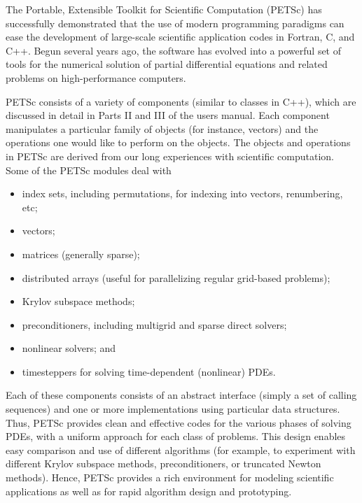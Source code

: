 
%
%
%

\label{sec_gettingstarted}

The Portable, Extensible Toolkit for Scientific Computation (PETSc)
has successfully demonstrated that the use of modern programming
paradigms can ease the development of large-scale scientific
application codes in Fortran, C, and C++.  Begun several years ago,
the software has evolved into a powerful set of tools for the
numerical solution of partial differential equations and related problems 
on high-performance computers.

PETSc consists of a variety of components (similar to classes in C++),
which are discussed in detail in Parts II and III of the users manual.
Each component manipulates a particular family of objects (for instance,
vectors) and the operations one would like to perform on the objects.
The objects and operations in PETSc are derived from our long 
experiences with scientific computation. Some of the PETSc modules deal with 
\begin{itemize} 
\item index sets, including permutations, for indexing into vectors, renumbering, etc;
\item vectors;
\item matrices (generally sparse);
\item distributed arrays (useful for parallelizing regular grid-based 
      problems);
\item Krylov subspace methods;
\item preconditioners, including multigrid and sparse direct solvers;
\item nonlinear solvers; and
\item timesteppers for solving time-dependent (nonlinear) PDEs.
\end{itemize}
Each of these components consists of an abstract interface 
(simply a set of calling sequences) and one or more implementations 
using particular data structures. Thus, PETSc provides clean and 
effective codes for the various phases of solving PDEs, with a uniform 
approach for each class of problems.  This design
enables easy comparison and use of different algorithms (for example,
to experiment with different Krylov subspace methods, preconditioners,
or truncated Newton methods).
Hence, PETSc provides a rich environment for modeling scientific
applications as well as for rapid algorithm design and prototyping.

